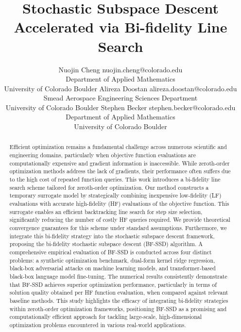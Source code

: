 \documentclass[10pt]{article} %
\title{Stochastic Subspace Descent Accelerated via Bi-fidelity Line Search}
\author{\name Nuojin Cheng \email nuojin.cheng@colorado.edu \\
      \addr Department of Applied Mathematics\\
      University of Colorado Boulder
      \AND
      \name Alireza Doostan \email alireza.doostan@colorado.edu \\
      \addr Smead Aerospace Engineering Sciences Department\\
      University of Colorado Boulder
      \AND
      \name Stephen Becker \email stephen.becker@colorado.edu\\
      \addr Department of Applied Mathematics \\
      University of Colorado Boulder}
\numberwithin{equation}{section}
\theoremstyle{plain}
\theoremstyle{definition}
\newcommand{\<}{\langle}
\renewcommand{\>}{\rangle}
\renewcommand{\(}{\left(}
\renewcommand{\)}{\right)}
\renewcommand{\[}{\left[}
\renewcommand{\]}{\right]}
\begin{document}
\maketitle





\begin{abstract}

    Efficient optimization remains a fundamental challenge across numerous scientific and engineering domains, particularly when objective function evaluations are computationally expensive and gradient information is inaccessible. While zeroth-order optimization methods address the lack of gradients, their performance often suffers due to the high cost of repeated function queries. This work introduces a bi-fidelity line search scheme tailored for zeroth-order optimization. Our method constructs a temporary surrogate model by strategically combining inexpensive low-fidelity (LF) evaluations with accurate high-fidelity (HF) evaluations of the objective function. This surrogate enables an efficient backtracking line search for step size selection, significantly reducing the number of costly HF queries required. We provide theoretical convergence guarantees for this scheme under standard assumptions. Furthermore, we integrate this bi-fidelity strategy into the stochastic subspace descent framework, proposing the bi-fidelity stochastic subspace descent (BF-SSD) algorithm. A comprehensive empirical evaluation of BF-SSD is conducted across four distinct problems: a synthetic optimization benchmark, dual-form kernel ridge regression, black-box adversarial attacks on machine learning models, and transformer-based black-box language model fine-tuning. The numerical results consistently demonstrate that BF-SSD achieves superior optimization performance, particularly in terms of solution quality obtained per HF function evaluation, when compared against relevant baseline methods. This study highlights the efficacy of integrating bi-fidelity strategies within zeroth-order optimization frameworks, positioning BF-SSD as a promising and computationally efficient approach for tackling large-scale, high-dimensional optimization problems encountered in various real-world applications.

\end{abstract}
\end{document}
